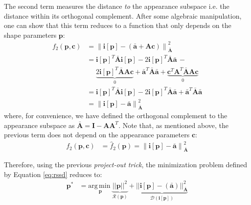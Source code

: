 The second term measures the distance \emph{to} the appearance subspace i.e. the distance within its orthogonal complement. After some algebraic manipulation, one can show that this term reduces to a function that only depends on the shape parameters $\mathbf{p}$:
\begin{equation}
    \begin{aligned}
        f_2(\mathbf{p}, \mathbf{c}) & = \left\| \mathbf{i}[\mathbf{p}] - \left( \bar{\mathbf{a}} + \mathbf{A} \mathbf{c} \right) \right\|_{\bar{\mathbf{A}}}^2
        \\
        & = \mathbf{i}[\mathbf{p}]^T \bar{\mathbf{A}} \mathbf{i}[\mathbf{p}] - 2\mathbf{i}[\mathbf{p}]^T \bar{\mathbf{A}} \bar{\mathbf{a}} \, - 
        \\
        & \quad \,\, \underbrace{2\mathbf{i}[\mathbf{p}]^T \bar{\mathbf{A}} \mathbf{A}\mathbf{c}}_{0} + \bar{\mathbf{a}}^T \bar{\mathbf{A}} \bar{\mathbf{a}} + \underbrace{\mathbf{c}^T \mathbf{A}^T \bar{\mathbf{A}} \mathbf{A}\mathbf{c}}_{0}
        \\
        & = \mathbf{i}[\mathbf{p}]^T \bar{\mathbf{A}} \mathbf{i}[\mathbf{p}] - 2\mathbf{i}[\mathbf{p}]^T \bar{\mathbf{A}} \bar{\mathbf{a}} + \bar{\mathbf{a}}^T \bar{\mathbf{A}} \bar{\mathbf{a}}
        \\
        & = \left\| \mathbf{i}[\mathbf{p}] - \bar{\mathbf{a}} \right\|_{\bar{\mathbf{A}}}^2
    \label{eq:ssd_term2}
    \end{aligned}
\end{equation}
where, for convenience, we have defined the orthogonal complement to the appearance subspace as $\bar{\mathbf{A}}= \mathbf{I} -\mathbf{A}\mathbf{A}^T$. Note that, as mentioned above, the previous term does not depend on the appearance parameters $\mathbf{c}$:
\begin{equation}
    \begin{aligned}
        f_2(\mathbf{p}, \mathbf{c}) & = \hat{f}_2(\mathbf{p}) = \left\| \mathbf{i}[\mathbf{p}] - \bar{\mathbf{a}} \right\|_{\bar{\mathbf{A}}}^2
    \label{eq:po_term}
    \end{aligned}
\end{equation}

Therefore, using the previous \emph{project-out trick}, the minimization problem defined by Equation \ref{eq:rssd} reduces to:
\begin{equation}
    \begin{aligned}
        \mathbf{p}^* & = \underset{\mathbf{p}} {\mathrm{arg\, min\;}} \underbrace{||\mathbf{p}||^2}_{\mathcal{R} (\mathbf{p})} + \underbrace{|| \mathbf{i}[\mathbf{p}] - (\mathbf{\bar{a}}) ||^2_{\bar{\mathbf{A}}}}_{\mathcal{D} (\mathbf{i}[\mathbf{p}])}
    \label{eq:rpo}
    \end{aligned}
\end{equation}

